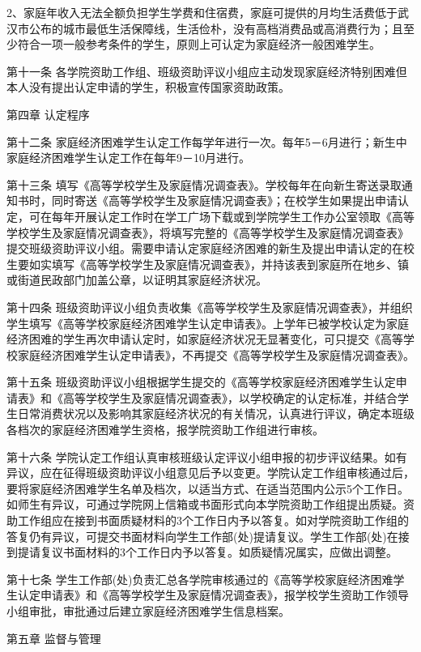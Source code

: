 \documentclass[UTF8,12pt,a4paper]{report}
\begin{document}
2、家庭年收入无法全额负担学生学费和住宿费，家庭可提供的月均生活费低于武汉市公布的城市最低生活保障线，生活俭朴，没有高档消费品或高消费行为；且至少符合一项一般参考条件的学生，原则上可认定为家庭经济一般困难学生。

第十一条 各学院资助工作组、班级资助评议小组应主动发现家庭经济特别困难但本人没有提出认定申请的学生，积极宣传国家资助政策。

第四章 认定程序

第十二条 家庭经济困难学生认定工作每学年进行一次。每年5－6月进行；新生中家庭经济困难学生认定工作在每年9－10月进行。

第十三条 填写《高等学校学生及家庭情况调查表》。学校每年在向新生寄送录取通知书时，同时寄送《高等学校学生及家庭情况调查表》；在校学生如果提出申请认定，可在每年开展认定工作时在学工广场下载或到学院学生工作办公室领取《高等学校学生及家庭情况调查表》，将填写完整的《高等学校学生及家庭情况调查表》提交班级资助评议小组。需要申请认定家庭经济困难的新生及提出申请认定的在校生要如实填写《高等学校学生及家庭情况调查表》，并持该表到家庭所在地乡、镇或街道民政部门加盖公章，以证明其家庭经济状况。

第十四条 班级资助评议小组负责收集《高等学校学生及家庭情况调查表》，并组织学生填写《高等学校家庭经济困难学生认定申请表》。上学年已被学校认定为家庭经济困难的学生再次申请认定时，如家庭经济状况无显著变化，可只提交《高等学校家庭经济困难学生认定申请表》，不再提交《高等学校学生及家庭情况调查表》。

第十五条 班级资助评议小组根据学生提交的《高等学校家庭经济困难学生认定申请表》和《高等学校学生及家庭情况调查表》，以学校确定的认定标准，并结合学生日常消费状况以及影响其家庭经济状况的有关情况，认真进行评议，确定本班级各档次的家庭经济困难学生资格，报学院资助工作组进行审核。

第十六条 学院认定工作组认真审核班级认定评议小组申报的初步评议结果。如有异议，应在征得班级资助评议小组意见后予以变更。学院认定工作组审核通过后，要将家庭经济困难学生名单及档次，以适当方式、在适当范围内公示5个工作日。如师生有异议，可通过学院网上信箱或书面形式向本学院资助工作组提出质疑。资助工作组应在接到书面质疑材料的3个工作日内予以答复。如对学院资助工作组的答复仍有异议，可提交书面材料向学生工作部(处)提请复议。学生工作部(处)在接到提请复议书面材料的3个工作日内予以答复。如质疑情况属实，应做出调整。

第十七条 学生工作部(处)负责汇总各学院审核通过的《高等学校家庭经济困难学生认定申请表》和《高等学校学生及家庭情况调查表》，报学校学生资助工作领导小组审批，审批通过后建立家庭经济困难学生信息档案。

第五章 监督与管理
\end{document}
